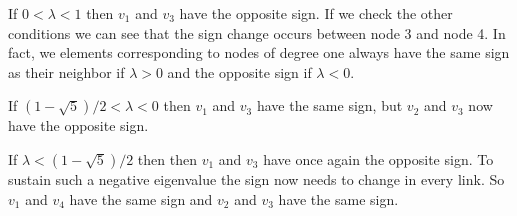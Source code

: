 If $0<\lambda<1$ then $v_1$ and $v_3$ have the opposite sign. If we check the other conditions we can see that the sign change occurs between node 3 and node 4. In fact, we elements corresponding to nodes of degree one always have the same sign as their neighbor if $\lambda>0$ and the opposite sign if $\lambda<0$. 

If $(1-\sqrt{5})/2< \lambda < 0$ then $v_1$ and $v_3$ have the same sign, but $v_2$ and $v_3$ now have the opposite sign.  

If $\lambda<(1-\sqrt{5})/2$ then then $v_1$ and $v_3$ have once again the opposite sign. To sustain such a negative eigenvalue the sign now needs to change in every link. So $v_1$ and $v_4$ have the same sign and $v_2$ and $v_3$ have the same sign. 
 



